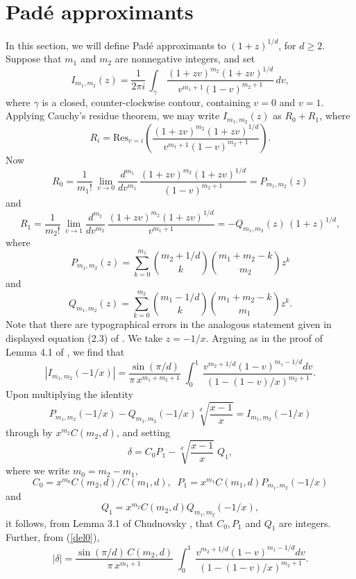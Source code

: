 \section{Pad\'e approximants} \label{Pade}


In this section, we will define Pad\'e approximants to $(1+z)^{1/d}$, for $d \geq 2$.
Suppose that $m_1$ and $m_2$ are nonnegative integers, and set
$$
I_{m_1,m_2}(z) = \frac{1}{2 \pi i} \, \int_{\gamma} ~
\frac{(1+zv)^{m_2}(1+zv)^{1/d}}{v^{m_1+1} (1-v)^{m_2+1}} \, dv,
$$
where $\gamma$ is a closed, counter-clockwise contour, containing $v=0$ and $v=1$. Applying Cauchy's residue theorem, we may write $I_{m_1,m_2}(z)$ as $R_0+R_1$, where
$$
R_i = \mbox{Res}_{v=i} \left( \frac{(1+zv)^{m_2}(1+zv)^{1/d}}{v^{m_1+1} (1-v)^{m_2+1}} \right). 
$$
Now
$$
R_0=
\frac{1}{m_1!} \, \lim_{v \rightarrow 0} \frac{d^{m_1}}{dv^{m_1}} \, \frac{(1+zv)^{m_2}(1+zv)^{1/d}}{(1-v)^{m_2+1}} = P_{m_1,m_2} (z) 
$$
and
$$
R_1=
\frac{1}{m_2!} \, \lim_{v \rightarrow 1} \frac{d^{m_2}}{dv^{m_2}} \, \frac{(1+zv)^{m_2}(1+zv)^{1/d}}{v^{m_1+1}} =  - Q_{m_1,m_2} (z) \, (1+z)^{1/d},
$$
where
\begin{equation}  
P_{m_1,m_2} (z) = \sum_{k=0}^{m_1} \binom{m_2 + 1/d}{k} \binom{m_1+m_2-k}{m_2} z^k
\end{equation}
and
\begin{equation} \label{queu}
Q_{m_1,m_2} (z) = \sum_{k=0}^{m_2} \binom{m_1 - 1/d}{k} \binom{m_1+m_2-k}{m_1} z^k.
\end{equation}
Note that there are typographical errors in the analogous statement given in displayed equation (2.3) of \cite{BaBe}.
We take $z=-1/x$. Arguing as in the proof of Lemma 4.1 of \cite{BaBe}, we find that
\begin{equation} \label{del0}
|I_{m_1,m_2}(-1/x)| = \frac{\sin (\pi/d)}{\pi \,  x^{m_1+m_2+1}} \;  \int^{1}_{0} ~
\frac{v^{m_2+1/d} (1-v)^{m_1-1/d} dv}{(1-(1-v)/x)^{m_2+1}}.
\end{equation}
Upon multiplying the identity
$$
P_{m_1, m_2}(-1/x)-Q_{m_1, m_2}(-1/x)   \sqrt[d]{\frac{x-1}{x}} =I_{m_1,m_2}(-1/x) 
$$
through by $x^{m_2} C(m_2,d)$,
and setting
$$
\delta = C_0 P_1 -  \sqrt[d]{\frac{x-1}{x}} \; Q_1,
$$
where we write $m_0=m_2-m_1$,
$$
C_0 = x^{m_0} C(m_2,d)/C(m_1,d), \; \; P_1 = x^{m_1} C(m_1,d) P_{m_1,m_2}(-1/x)
$$
and
\begin{equation} \label{Q1-def}
Q_1=x^{m_2} C(m_2,d) Q_{m_1,m_2}(-1/x),
\end{equation}
it follows, from Lemma 3.1 of Chudnovsky \cite{Chud},
that $C_0, P_1$ and $Q_1$ are integers. Further, from (\ref{del0}), 
\begin{equation} \label{del}
|\delta| = \frac{\sin (\pi/d) \, C(m_2,d)}{\pi \,  x^{m_1+1}} \;  \int^{1}_{0} ~
\frac{v^{m_2+1/d} (1-v)^{m_1-1/d} dv}{(1-(1-v)/x)^{m_2+1}}.
\end{equation}

